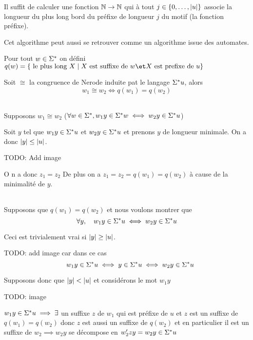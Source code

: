 Il suffit de calculer une fonction $\mathbb{N} \to \mathbb{N}$ qui à tout $j \in \left\{0,\ldots,|u|\right\}$ associe
la longueur du plus long bord du préfixe de longueur $j$ du motif (la fonction préfixe).


Cet algorithme peut aussi se retrouver comme un algorithme issue des automates.


\begin{definition}
	Pour tout $w \in \Sigma^{*}$ on défini
	$q(w) = \setdef {\text{ le plus long } X} {X \text{ est suffixe de } w \et X \text{ est prefixe de } u}$
\end{definition}

\begin{prop}
	Soit $\cong$ la congruence de Nerode induite pat le langage $\Sigma^{*} u$, alors
	$$ w_1 \cong w_2 \iff q(w_1) = q(w_2)$$
\end{prop}

\begin{proofI}
	\item \bimpLR \\
	Supposons $w_1 \cong w_2$ ($\forall w \in \Sigma^{*}, w_1y \in \Sigma^{*} w \iff w_2y\in \Sigma^{*} u$)

	Soit $y$ tel que $w_1 y \in \Sigma^{*} u$ et $w_2 y \in \Sigma^{*} u$ et prenons $y$ de longueur minimale.
	On a donc $|y| \leq |u|$.

	TODO: Add image

	O n a donc $z_1 = z_2$
	De plus on a $z_1 = z_2 = q(w_1) = q(w_2)$  à cause de la minimalité de $y$.

	\item \bimpRL \\
	Supposons que $q(w_1) = q(w_2)$ et nous voulons montrer que
	$$\forall y, \quad w_1 y \in \Sigma^{*} u \iff w_2 y \in \Sigma^{*} u$$

	Ceci est trivialement vrai si $|y| \geq |u|$.

	TODO: add image
	car dans ce cas
	$$\quad w_1 y \in \Sigma^{*} u \iff  y \in \Sigma^{*} u \iff w_2 y \in \Sigma^{*} u$$

	Supposons donc que $|y| < |u|$ et considérons le mot $w_1 y$

	TODO: image

	$w_1y \in \Sigma^{*} u \implies \exists$ un suffixe $z$ de $w_1$ qui est préfixe de $u$ et $z$ est un suffixe de $q(w_1) = q(w_2)$
	donc $z$ est aussi un suffixe de $q(w_2)$ et en particulier il est un suffixe de $w_2 \implies w_2 y $ se décompose en
	$w_2'zy = w_2 y \in \Sigma^{*} u$
\end{proofI}

